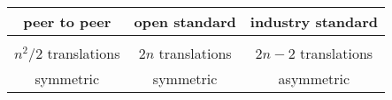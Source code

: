 \documentclass{article}
\begin{document}
  \begin{tabular}{|c|c|c|}\hline
    peer to peer & open standard & industry standard\\\hline
     &  & \\\hline
    $n^2/2$  translations & $2n$ translations & $2n-2$ translations \\
    symmetric & symmetric & asymmetric\\\hline
  \end{tabular}
\end{document}
